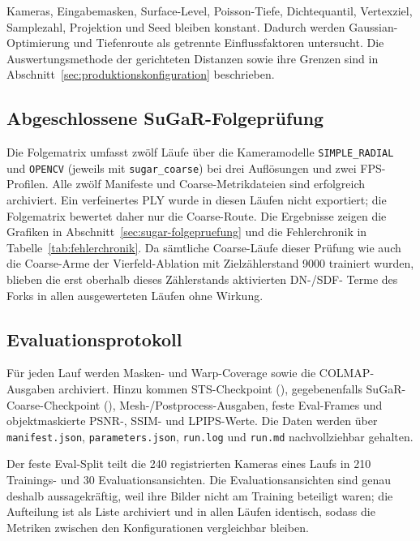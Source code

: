 Kameras, Eingabemasken, Surface-Level, Poisson-Tiefe, Dichtequantil,
Vertexziel, Samplezahl, Projektion und Seed bleiben konstant. Dadurch werden
Gaussian-Optimierung und Tiefenroute als getrennte Einflussfaktoren untersucht.
Die Auswertungsmethode der gerichteten Distanzen sowie ihre Grenzen sind in
Abschnitt~\ref{sec:produktionskonfiguration} beschrieben.

\subsection{Abgeschlossene SuGaR-Folgeprüfung}
\label{subsec:sugar-folgepruefung}

Die Folgematrix umfasst zwölf Läufe über die Kameramodelle
\texttt{SIMPLE\_RADIAL} und \texttt{OPENCV} (jeweils mit
\texttt{sugar\_coarse}) bei drei Auflösungen und zwei FPS-Profilen. Alle zwölf
Manifeste und Coarse-Metrikdateien sind erfolgreich
archiviert. Ein verfeinertes PLY wurde in diesen Läufen nicht exportiert; die
Folgematrix bewertet daher nur die Coarse-Route. Die Ergebnisse zeigen die
Grafiken in Abschnitt~\ref{sec:sugar-folgepruefung} und die Fehlerchronik in
Tabelle~\ref{tab:fehlerchronik}. Da sämtliche Coarse-Läufe dieser Prüfung wie
auch die Coarse-Arme der Vierfeld-Ablation mit Zielzählerstand 9000 trainiert
wurden, blieben die erst oberhalb dieses Zählerstands aktivierten DN-/SDF-
Terme des Forks in allen ausgewerteten Läufen ohne Wirkung.


\subsection{Evaluationsprotokoll}

Für jeden Lauf werden Masken- und Warp-Coverage sowie die COLMAP-Ausgaben
archiviert. Hinzu kommen STS-Checkpoint (), gegebenenfalls
SuGaR-Coarse-Checkpoint (), Mesh-/Postprocess-Ausgaben, feste
Eval-Frames und objektmaskierte PSNR-, SSIM- und LPIPS-Werte. Die Daten werden über
\texttt{manifest.json}, \texttt{parameters.json}, \texttt{run.log} und
\texttt{run.md} nachvollziehbar gehalten.

Der feste Eval-Split teilt die 240 registrierten Kameras eines Laufs in 210
Trainings- und 30 Evaluationsansichten. Die Evaluationsansichten sind genau
deshalb aussagekräftig, weil ihre Bilder nicht am Training beteiligt waren;
die Aufteilung ist als Liste archiviert und in allen Läufen identisch, sodass
die Metriken zwischen den Konfigurationen vergleichbar bleiben.

